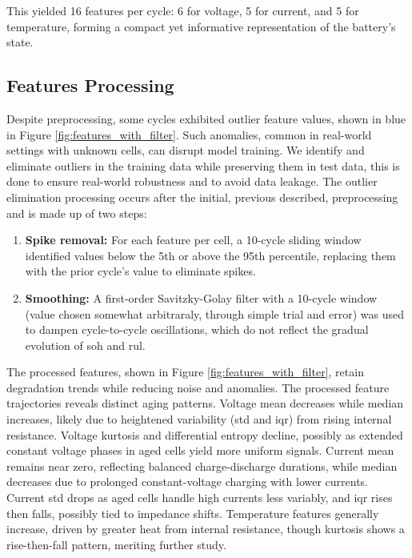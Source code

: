 This yielded 16 features per cycle: 6 for voltage, 5 for current, and 5 for temperature, forming a compact yet informative representation of the battery’s state. 

\subsection{Features Processing}

Despite preprocessing, some cycles exhibited outlier feature values, shown in blue in Figure \ref{fig:features_with_filter}. Such anomalies, common in real-world settings with unknown cells, can disrupt model training. We identify and eliminate outliers in the training data while preserving them in test data, this is done to ensure real-world robustness and to avoid data leakage. The outlier elimination processing occurs after the initial, previous described, preprocessing and is made up of two steps:

\begin{enumerate}
    \item \textbf{Spike removal:} For each feature per cell, a 10-cycle sliding window identified values below the 5th or above the 95th percentile, replacing them with the prior cycle’s value to eliminate spikes.
    \item \textbf{Smoothing:} A first-order Savitzky-Golay filter with a 10-cycle window (value chosen somewhat arbitraraly, through simple trial and error) was used to dampen cycle-to-cycle oscillations, which do not reflect the gradual evolution of \ac{soh} and \ac{rul}. 
\end{enumerate}

The processed features, shown in Figure \ref{fig:features_with_filter}, retain degradation trends while reducing noise and anomalies. The processed feature trajectories reveals distinct aging patterns. Voltage mean decreases while median increases, likely due to heightened variability (\ac{std} and \ac{iqr}) from rising internal resistance. Voltage kurtosis and differential entropy decline, possibly as extended constant voltage phases in aged cells yield more uniform signals. Current mean remains near zero, reflecting balanced charge-discharge durations, while median decreases due to prolonged constant-voltage charging with lower currents. Current \ac{std} drops as aged cells handle high currents less variably, and \ac{iqr} rises then falls, possibly tied to impedance shifts. Temperature features generally increase, driven by greater heat from internal resistance, though kurtosis shows a rise-then-fall pattern, meriting further study.

